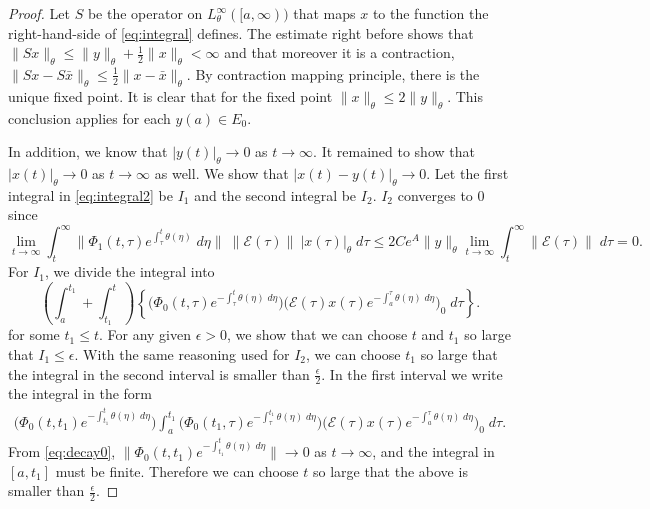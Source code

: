 \documentclass[a4paper,11pt]{article}
\newcommand{\E}{\mathcal{E}}
\theoremstyle{remark}
\begin{document}
\begin{proof}
Let $S$ be the operator on $L^\infty_{\theta}([a,\infty))$ that maps $x$ to the function the right-hand-side of \eqref{eq:integral} defines. The estimate right before shows that $\|Sx\|_\theta \le \|y\|_\theta + \frac{1}{2} \|x\|_\theta < \infty$ and that moreover it is a contraction, $\|Sx - S\bar{x}\|_\theta \le \frac{1}{2} \|x-\bar{x}\|_\theta$. By contraction mapping principle, there is the unique fixed point. It is clear that for the fixed point $\|x\|_\theta \le 2\|y\|_\theta$. This conclusion applies for each $y(a) \in E_0$.

In addition, we know that $|y(t)|_\theta \rightarrow 0$ as $t \rightarrow \infty$. It remained to show that $|x(t)|_\theta \rightarrow 0$ as $t \rightarrow \infty$ as well. We show that $|x(t)-y(t)|_\theta \rightarrow 0$. Let the first integral in \eqref{eq:integral2} be $I_1$ and the second integral be $I_2$. $I_2$ converges to $0$ since
$$\lim_{t \rightarrow\infty}\int_t^\infty \|\Phi_1(t,\tau)e^{\int_\tau^t \theta(\eta)}\;d\eta\| \: \|\E(\tau)\| \:|x(\tau)|_\theta \; d\tau\le 2C e^A \|y\|_\theta \lim_{t \rightarrow \infty}\int_t^\infty \|\E(\tau)\| \;d\tau = 0.$$
For $I_1$, we divide the integral into 
$$\left(\int_a^{t_1} + \int_{t_1}^t \right) \left\{\big(\Phi_0(t,\tau)e^{-\int_\tau^t \theta(\eta) \;d\eta}\big)\big(\E(\tau) x(\tau)e^{-\int_a^\tau \theta(\eta) \;d\eta}\big)_0 \;d\tau\right\}.$$
for some $t_1 \le t$. For any given $\epsilon>0$, we show that we can choose $t$ and $t_1$ so large that $I_1 \le \epsilon$. With the same reasoning used for $I_2$, we can choose $t_1$ so large that the integral in the second interval is smaller than $ \frac{\epsilon}{2}$. In the first interval we write the integral in the form
\begin{align*}
 \big(\Phi_0(t,t_1)e^{-\int_{t_1}^t \theta(\eta)\;d\eta}\big) \int_a^{t_1} \big(\Phi_0(t_1,\tau)e^{-\int_\tau^{t_1} \theta(\eta) \;d\eta}\big)\big(\E(\tau) x(\tau)e^{-\int_a^\tau \theta(\eta) \;d\eta}\big)_0 \;d\tau.
\end{align*}
From \eqref{eq:decay0}, $\|\Phi_0(t,t_1)e^{-\int_{t_1}^t \theta(\eta)\;d\eta}\| \rightarrow 0$ as $t \rightarrow \infty$, and the integral in $[a,t_1]$ must be finite. Therefore we can choose $t$ so large that the above is smaller than $ \frac{\epsilon}{2}$.
\end{proof}
\end{document}
